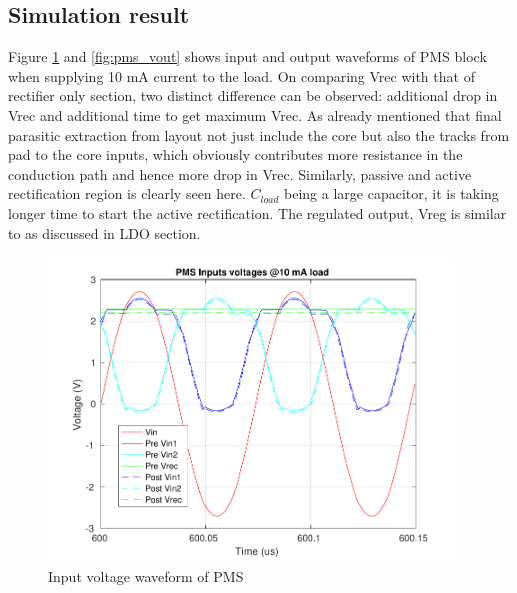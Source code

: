 \documentclass[12pt,a4paper,UKenglish]{report}
\begin{document}
\subsection{Simulation result} %

Figure \ref{fig:pms_vin} and \ref{fig:pms_vout} shows input and output waveforms of PMS block when supplying 10 mA current to the load. On comparing Vrec with 
that of rectifier only section, two distinct difference can be observed: additional drop in Vrec and additional time to 
get maximum Vrec. As already mentioned that final parasitic extraction from layout not just include the core but also 
the tracks from pad to the core inputs, which obviously contributes more resistance in the conduction path and hence 
more drop in Vrec. Similarly, passive and active rectification region is clearly seen here. $C_{load}$ being a large 
capacitor, it is taking longer time to start the active rectification. The regulated output, Vreg is similar to as discussed in LDO section. \\

\begin{figure} [!htb]
  \centering
  \includegraphics[width=0.96\textwidth]{img/pms/pms2_Vs_both.pdf} 
 \caption{Input voltage waveform of PMS} 
\label{fig:pms_vin} 
\end{figure}
\end{document}
